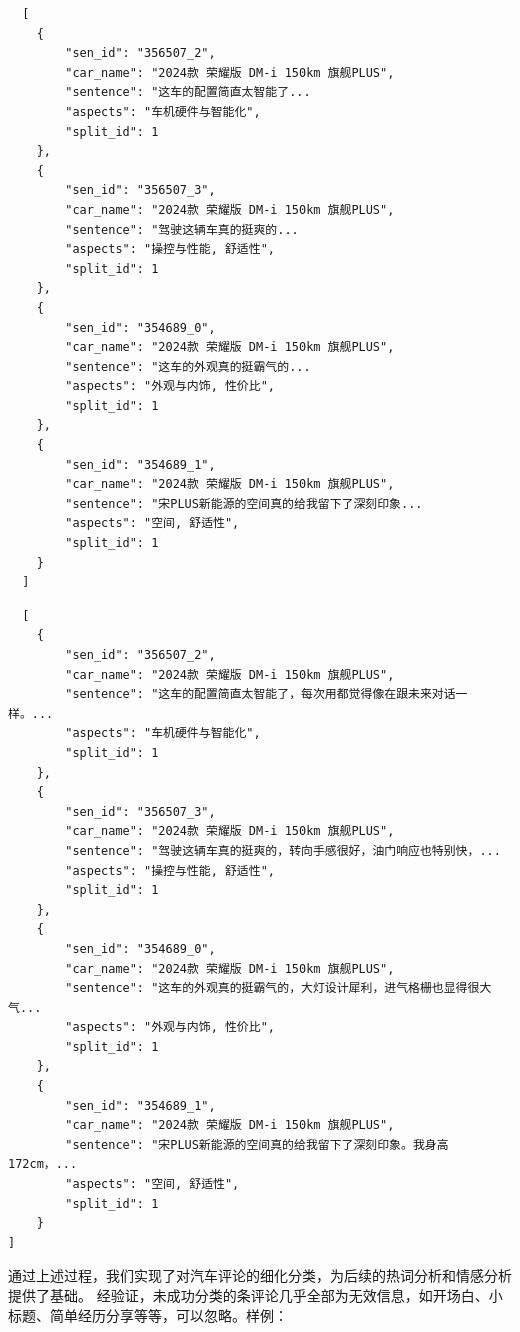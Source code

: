 \documentclass[UTF8,a4paper,15pt,titlepage,oneside]{ctexbook}
\begin{document}
\begin{mdframed}[backgroundcolor=lightgray!20, linecolor=darkgray, linewidth=1pt]
  \begin{verbatim}
  [
    {
        "sen_id": "356507_2",
        "car_name": "2024款 荣耀版 DM-i 150km 旗舰PLUS",
        "sentence": "这车的配置简直太智能了...
        "aspects": "车机硬件与智能化",
        "split_id": 1
    },
    {
        "sen_id": "356507_3",
        "car_name": "2024款 荣耀版 DM-i 150km 旗舰PLUS",
        "sentence": "驾驶这辆车真的挺爽的...
        "aspects": "操控与性能, 舒适性",
        "split_id": 1
    },
    {
        "sen_id": "354689_0",
        "car_name": "2024款 荣耀版 DM-i 150km 旗舰PLUS",
        "sentence": "这车的外观真的挺霸气的...
        "aspects": "外观与内饰, 性价比",
        "split_id": 1
    },
    {
        "sen_id": "354689_1",
        "car_name": "2024款 荣耀版 DM-i 150km 旗舰PLUS",
        "sentence": "宋PLUS新能源的空间真的给我留下了深刻印象...
        "aspects": "空间, 舒适性",
        "split_id": 1
    }
  ]
\end{verbatim}
  \end{mdframed}

  \begin{mdframed}[backgroundcolor=lightgray!20, linecolor=darkgray, linewidth=1pt]
    \begin{verbatim}
  [
    {
        "sen_id": "356507_2",
        "car_name": "2024款 荣耀版 DM-i 150km 旗舰PLUS",
        "sentence": "这车的配置简直太智能了，每次用都觉得像在跟未来对话一样。...
        "aspects": "车机硬件与智能化",
        "split_id": 1
    },
    {
        "sen_id": "356507_3",
        "car_name": "2024款 荣耀版 DM-i 150km 旗舰PLUS",
        "sentence": "驾驶这辆车真的挺爽的，转向手感很好，油门响应也特别快，...
        "aspects": "操控与性能, 舒适性",
        "split_id": 1
    },
    {
        "sen_id": "354689_0",
        "car_name": "2024款 荣耀版 DM-i 150km 旗舰PLUS",
        "sentence": "这车的外观真的挺霸气的，大灯设计犀利，进气格栅也显得很大气...
        "aspects": "外观与内饰, 性价比",
        "split_id": 1
    },
    {
        "sen_id": "354689_1",
        "car_name": "2024款 荣耀版 DM-i 150km 旗舰PLUS",
        "sentence": "宋PLUS新能源的空间真的给我留下了深刻印象。我身高172cm，...
        "aspects": "空间, 舒适性",
        "split_id": 1
    }
]
  \end{verbatim}
    \end{mdframed}

通过上述过程，我们实现了对汽车评论的细化分类，为后续的热词分析和情感分析提供了基础。
经验证，未成功分类的条评论几乎全部为无效信息，如开场白、小标题、简单经历分享等等，可以忽略。样例：
\end{document}
